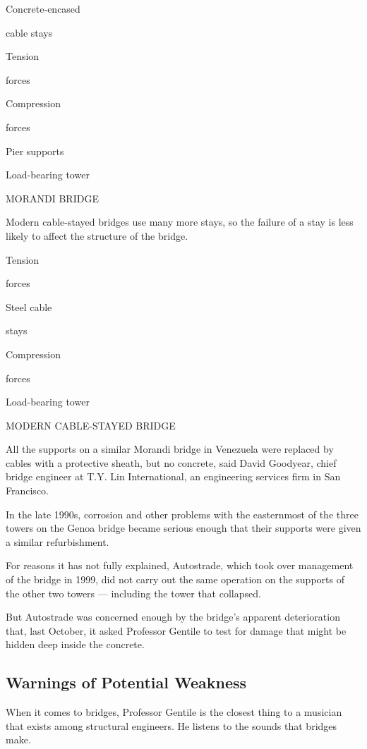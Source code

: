 Concrete-encased

cable stays

Tension

forces

Compression

forces

Pier supports

Load-bearing tower

MORANDI BRIDGE

Modern cable-stayed bridges use many more stays, so the failure of a
stay is less likely to affect the structure of the bridge.

Tension

forces

Steel cable

stays

Compression

forces

Load-bearing tower

MODERN CABLE-STAYED BRIDGE

All the supports on a similar Morandi bridge in Venezuela were replaced
by cables with a protective sheath, but no concrete, said David
Goodyear, chief bridge engineer at T.Y. Lin International, an
engineering services firm in San Francisco.

In the late 1990s, corrosion and other problems with the easternmost of
the three towers on the Genoa bridge became serious enough that their
supports were given a similar refurbishment.

For reasons it has not fully explained, Autostrade, which took over
management of the bridge in 1999, did not carry out the same operation
on the supports of the other two towers --- including the tower that
collapsed.

But Autostrade was concerned enough by the bridge's apparent
deterioration that, last October, it asked Professor Gentile to test for
damage that might be hidden deep inside the concrete.

\hypertarget{warnings-of-potential-weakness}{%
\subsection{Warnings of Potential
Weakness}\label{warnings-of-potential-weakness}}

When it comes to bridges, Professor Gentile is the closest thing to a
musician that exists among structural engineers. He listens to the
sounds that bridges make.

